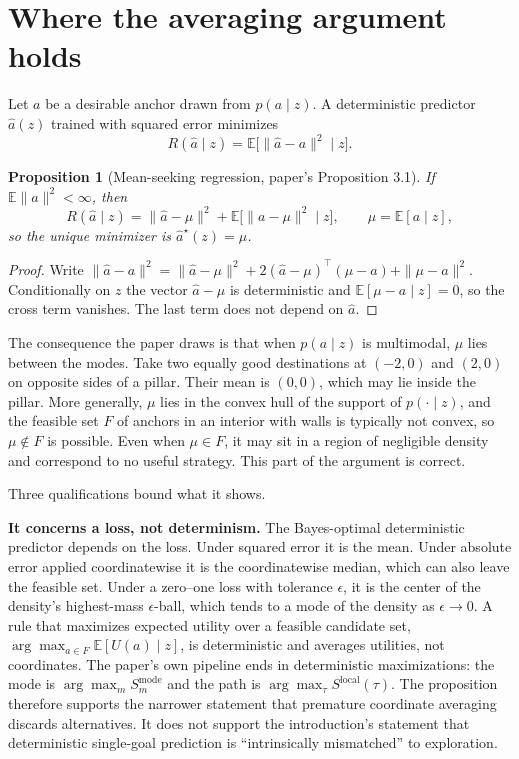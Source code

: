 \documentclass[11pt]{article}
\theoremstyle{plain}
\newtheorem{proposition}{Proposition}
\theoremstyle{remark}
\newcommand{\E}{\mathbb E}
\begin{document}
\section{Where the averaging argument holds}\label{sec:avg}

Let $a$ be a desirable anchor drawn from $p(a\mid z)$. A deterministic predictor $\hat a(z)$ trained with squared error minimizes
\[
R(\hat a\mid z)=\E\big[\|\hat a-a\|^2\mid z\big].
\]

\begin{proposition}[Mean-seeking regression, paper's Proposition 3.1]\label{prop:mean}
If $\E\|a\|^2<\infty$, then
\[
R(\hat a\mid z)=\|\hat a-\mu\|^2+\E\big[\|a-\mu\|^2\mid z\big],\qquad \mu=\E[a\mid z],
\]
so the unique minimizer is $\hat a^\star(z)=\mu$.
\end{proposition}
\begin{proof}
Write $\|\hat a-a\|^2=\|\hat a-\mu\|^2+2(\hat a-\mu)^\top(\mu-a)+\|\mu-a\|^2$. Conditionally on $z$ the vector $\hat a-\mu$ is deterministic and $\E[\mu-a\mid z]=0$, so the cross term vanishes. The last term does not depend on $\hat a$.
\end{proof}

The consequence the paper draws is that when $p(a\mid z)$ is multimodal, $\mu$ lies between the modes. Take two equally good destinations at $(-2,0)$ and $(2,0)$ on opposite sides of a pillar. Their mean is $(0,0)$, which may lie inside the pillar. More generally, $\mu$ lies in the convex hull of the support of $p(\cdot\mid z)$, and the feasible set $F$ of anchors in an interior with walls is typically not convex, so $\mu\notin F$ is possible. Even when $\mu\in F$, it may sit in a region of negligible density and correspond to no useful strategy. This part of the argument is correct.

Three qualifications bound what it shows.

\textbf{It concerns a loss, not determinism.} The Bayes-optimal deterministic predictor depends on the loss. Under squared error it is the mean. Under absolute error applied coordinatewise it is the coordinatewise median, which can also leave the feasible set. Under a zero--one loss with tolerance $\epsilon$, it is the center of the density's highest-mass $\epsilon$-ball, which tends to a mode of the density as $\epsilon\to0$. A rule that maximizes expected utility over a feasible candidate set, $\arg\max_{a\in F}\E[U(a)\mid z]$, is deterministic and averages utilities, not coordinates. The paper's own pipeline ends in deterministic maximizations: the mode is $\arg\max_m S^{\mathrm{mode}}_m$ and the path is $\arg\max_\tau S^{\mathrm{local}}(\tau)$. The proposition therefore supports the narrower statement that premature coordinate averaging discards alternatives. It does not support the introduction's statement that deterministic single-goal prediction is ``intrinsically mismatched'' to exploration.
\end{document}
